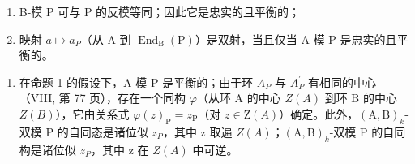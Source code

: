 \begin{enumerate}
\def\labelenumi{\alph{enumi})}
\item
  B-模 P 可与 P 的反模等同；因此它是忠实的且平衡的；
\item
  映射 \(a \mapsto a_{P}\)（从 A 到 \(\operatorname{End}_{\mathrm{B}}(\mathrm{P})\)）是双射，当且仅当 A-模 P 是忠实的且平衡的。
\end{enumerate}

\begin{enumerate}
\def\labelenumi{\arabic{enumi})}
\setcounter{enumi}{1}
\tightlist
\item
  在命题 1 的假设下，A-模 P 是平衡的；由于环 \(A_{P}\) 与 \(A_{P}^{\prime}\) 有相同的中心（VIII, 第 77 页），存在一个同构 \(\varphi\)（从环 A 的中心 \(Z(A)\) 到环 B 的中心 \(Z(B)\)），它由关系式 \(\varphi(z)_{\mathrm{P}} = z_{\mathrm{P}}\)（对 \(z \in \mathrm{Z}(A)\)）确定。此外，\((\mathrm{A}, \mathrm{B})_{k}\)-双模 P 的自同态是诸位似 \(z_{P}\)，其中 z 取遍 \(Z(A)\)；\((\mathrm{A}, \mathrm{B})_{k}\)-双模 P 的自同构是诸位似 \(z_{P}\)，其中 z 在 \(Z(A)\) 中可逆。
\end{enumerate}
